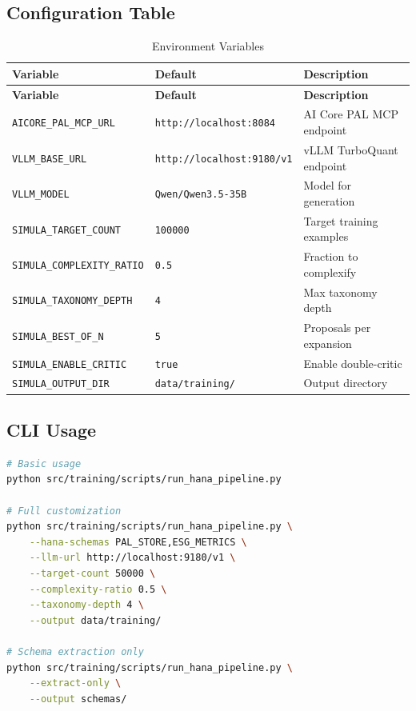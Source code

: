\documentclass[11pt,a4paper]{article}
\begin{document}
\subsection{Configuration Table}

\begin{longtable}{p{5cm}p{3cm}p{6cm}}
\caption{Environment Variables} \\
\toprule
\textbf{Variable} & \textbf{Default} & \textbf{Description} \\
\midrule
\endfirsthead
\toprule
\textbf{Variable} & \textbf{Default} & \textbf{Description} \\
\midrule
\endhead
\texttt{AICORE\_PAL\_MCP\_URL} & \texttt{http://localhost:8084} & AI Core PAL MCP endpoint \\
\texttt{VLLM\_BASE\_URL} & \texttt{http://localhost:9180/v1} & vLLM TurboQuant endpoint \\
\texttt{VLLM\_MODEL} & \texttt{Qwen/Qwen3.5-35B} & Model for generation \\
\texttt{SIMULA\_TARGET\_COUNT} & \texttt{100000} & Target training examples \\
\texttt{SIMULA\_COMPLEXITY\_RATIO} & \texttt{0.5} & Fraction to complexify \\
\texttt{SIMULA\_TAXONOMY\_DEPTH} & \texttt{4} & Max taxonomy depth \\
\texttt{SIMULA\_BEST\_OF\_N} & \texttt{5} & Proposals per expansion \\
\texttt{SIMULA\_ENABLE\_CRITIC} & \texttt{true} & Enable double-critic \\
\texttt{SIMULA\_OUTPUT\_DIR} & \texttt{data/training/} & Output directory \\
\bottomrule
\end{longtable}

\subsection{CLI Usage}

\begin{lstlisting}[language=bash,caption={CLI entry point}]
# Basic usage
python src/training/scripts/run_hana_pipeline.py

# Full customization
python src/training/scripts/run_hana_pipeline.py \
    --hana-schemas PAL_STORE,ESG_METRICS \
    --llm-url http://localhost:9180/v1 \
    --target-count 50000 \
    --complexity-ratio 0.5 \
    --taxonomy-depth 4 \
    --output data/training/

# Schema extraction only
python src/training/scripts/run_hana_pipeline.py \
    --extract-only \
    --output schemas/
\end{lstlisting}
\end{document}
